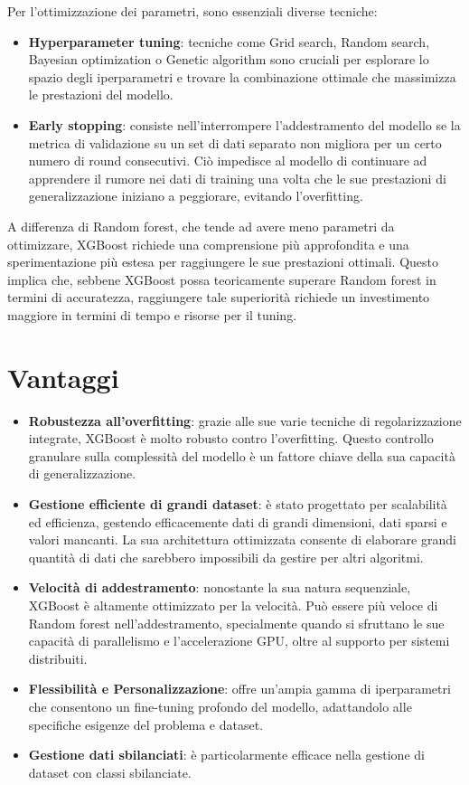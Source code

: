 \documentclass[a4paper,12pt]{report}
\begin{document}
	Per l'ottimizzazione dei parametri, sono essenziali diverse tecniche:
	\begin{itemize}
		\item \textbf{Hyperparameter tuning}: tecniche come Grid search, Random search, Bayesian optimization o Genetic algorithm sono cruciali per esplorare lo spazio degli iperparametri e trovare la combinazione ottimale che massimizza le prestazioni del modello.
		\item \textbf{Early stopping}: consiste nell'interrompere l'addestramento del modello se la metrica di validazione su un set di dati separato non migliora per un certo numero di round consecutivi. Ciò impedisce al modello di continuare ad apprendere il rumore nei dati di training una volta che le sue prestazioni di generalizzazione iniziano a peggiorare, evitando l'overfitting.
	\end{itemize}
	A differenza di Random forest, che tende ad avere meno parametri da ottimizzare, XGBoost richiede una comprensione più approfondita e una sperimentazione più estesa per raggiungere le sue prestazioni ottimali. Questo implica che, sebbene XGBoost possa teoricamente superare Random forest in termini di accuratezza, raggiungere tale superiorità richiede un investimento maggiore in termini di tempo e risorse per il tuning.
	
	\section{Vantaggi}
	
	\begin{itemize}
		\item \textbf{Robustezza all'overfitting}: grazie alle sue varie tecniche di regolarizzazione integrate, XGBoost è molto robusto contro l'overfitting. Questo controllo granulare sulla complessità del modello è un fattore chiave della sua capacità di generalizzazione.
		\item \textbf{Gestione efficiente di grandi dataset}: è stato progettato per scalabilità ed efficienza, gestendo efficacemente dati di grandi dimensioni, dati sparsi e valori mancanti. La sua architettura ottimizzata consente di elaborare grandi quantità di dati che sarebbero impossibili da gestire per altri algoritmi.
		\item \textbf{Velocità di addestramento}: nonostante la sua natura sequenziale, XGBoost è altamente ottimizzato per la velocità. Può essere più veloce di Random forest nell'addestramento, specialmente quando si sfruttano le sue capacità di parallelismo e l'accelerazione GPU, oltre al supporto per sistemi distribuiti.
		\item \textbf{Flessibilità e Personalizzazione}: offre un'ampia gamma di iperparametri che consentono un fine-tuning profondo del modello, adattandolo alle specifiche esigenze del problema e dataset.
		\item \textbf{Gestione dati sbilanciati}: è particolarmente efficace nella gestione di dataset con classi sbilanciate.
	\end{itemize}
	
\end{document}
